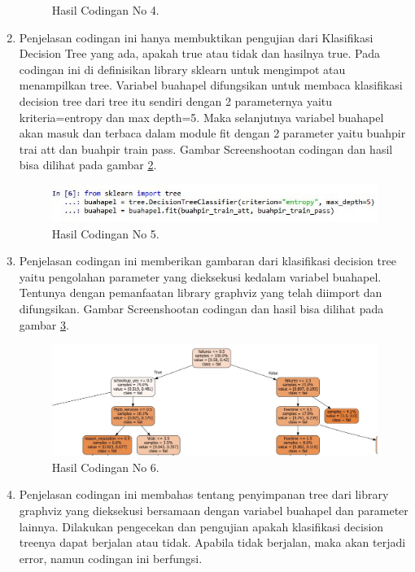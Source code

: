 \begin{enumerate}
\begin{figure}[ht]
		\caption{Hasil Codingan No 4.}
		\label{12}
\end{figure}
\item Penjelasan codingan ini hanya membuktikan pengujian dari Klasifikasi Decision Tree yang ada, apakah true atau tidak dan hasilnya true. Pada codingan ini di definisikan library sklearn untuk mengimpot atau menampilkan tree. Variabel buahapel difungsikan untuk membaca klasifikasi decision tree dari tree itu sendiri dengan 2 parameternya yaitu kriteria=entropy dan max depth=5. Maka selanjutnya variabel buahapel akan masuk dan terbaca dalam module fit dengan 2 parameter yaitu buahpir trai att dan buahpir train pass.
\subitem Gambar Screenshootan codingan dan hasil bisa dilihat pada gambar \ref{13}.
\begin{figure}[ht]
		\centerline{\includegraphics[width=1\textwidth]{figures/huda/5_hari4.JPG}}
		\caption{Hasil Codingan No 5.}
		\label{13}
\end{figure}
\item Penjelasan codingan ini memberikan gambaran dari klasifikasi decision tree yaitu pengolahan parameter yang dieksekusi kedalam variabel buahapel. Tentunya dengan pemanfaatan library graphviz yang telah diimport dan difungsikan.
\subitem Gambar Screenshootan codingan dan hasil bisa dilihat pada gambar \ref{14}.
\begin{figure}[ht]
		\centerline{\includegraphics[width=1\textwidth]{figures/huda/6_hari4.JPG}}
		\caption{Hasil Codingan No 6.}
		\label{14}
\end{figure}
\item Penjelasan codingan ini membahas tentang penyimpanan tree dari library graphviz yang dieksekusi bersamaan dengan variabel buahapel dan parameter lainnya. Dilakukan pengecekan dan pengujian apakah klasifikasi decision treenya dapat berjalan atau tidak. Apabila tidak berjalan, maka akan terjadi error, namun codingan ini berfungsi.

\end{enumerate}
